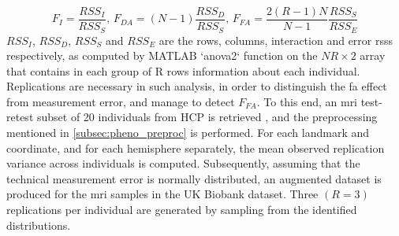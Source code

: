 $$
F_I=\frac{RSS_I}{RSS_S}\text{, }
F_{DA}=(N-1)\frac{RSS_D}{RSS_S}\text{, }
F_{FA}=\frac{2(R-1)N}{N-1} \frac{RSS_S}{RSS_E} 
$$ 
$RSS_I$, $RSS_D$, $RSS_S$ and $RSS_E$ are the rows, columns, interaction and error \acp{rss} respectively, as computed by MATLAB `anova2` function on the $NR\times2$ array that contains in each group of R rows information about each individual. Replications are necessary in such analysis, in order to distinguish the \ac{fa} effect from measurement error, and manage to detect $F_{FA}$. To this end, an \ac{mri} test-retest subset of 20 individuals from HCP is retrieved \cite{VanEssen2013}, and the preprocessing mentioned in \autoref{subsec:pheno_preproc} is performed. For each landmark and coordinate, and for each hemisphere separately, the mean observed replication variance across individuals is computed. Subsequently, assuming that the technical measurement error is normally distributed, an augmented dataset is produced for the \ac{mri} samples in the UK Biobank dataset. Three $(R=3)$ replications per individual are generated by sampling from the identified distributions.

